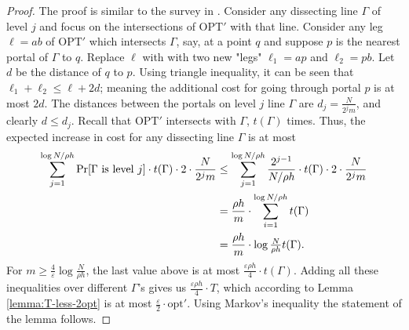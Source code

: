 \documentclass[10pt,a4paper]{amsart}
\theoremstyle{thmstyleone}
\newcommand{\eps}{\varepsilon}
\newcommand{\opt}{{\text{opt}}}
\newcommand{\OPT}{{\text{OPT}}}
\begin{document}
\begin{proof}
	The proof is similar to the survey in \cite{Vazirani}.
    Consider any dissecting line $\Gamma$ of level $j$ and focus on the intersections of $\OPT'$ with that line. Consider any leg $\ell = ab$ of $\OPT'$ which intersects $\Gamma$, say, at a point $q$ and suppose $p$ is the nearest portal of $\Gamma$ to $q$. Replace $\ell$ with
    with two new "legs" $\ell_1 = ap$ and $\ell_2 = pb$. Let $d$ be the distance of $q$ to $p$. Using triangle inequality, it can be seen that $\ell_1 + \ell_2 \leq \ell + 2d$; meaning the additional cost for going through portal $p$ is at most $2d$. The distances between the portals on level $j$ line $\Gamma$ are $d_j = \frac N{2^jm}$, and clearly $d\le d_j$. Recall that $\OPT'$ intersects with $\Gamma$, $t(\Gamma)$ times. Thus, the expected increase in cost for any dissecting line $\Gamma$ is at most
    \begin{align*}
        \sum_{j = 1}^{\log N/\rho h}\Pr[\Gamma {\rm \ is\ level\ } j]\cdot t(\Gamma)\cdot 2\cdot\frac N{2^jm} &\le \sum_{j = 1}^{\log N/\rho h}\frac{2^{j - 1}}{N/\rho h}\cdot t(\Gamma)\cdot2\cdot \frac N{2^j m}\\
        &= \frac{\rho h}m\cdot \sum_{i = 1}^{\log N/\rho h} t(\Gamma)\\
        &= \frac{\rho h}m \cdot \log \tfrac N{\rho h} t(\Gamma).
    \end{align*}
    For
    $m \ge \frac{4}\eps \log\frac N{\rho h}$, the last value above is at most $ \frac{\eps\rho h}{4}\cdot t(\Gamma)$. Adding all these inequalities over different $\Gamma$'s gives us $\frac{\eps\rho h}{4}\cdot T$, which according to Lemma \ref{lemma:T-less-2opt} is at most $\frac\eps2\cdot \opt'$. Using Markov's inequality the statement of the lemma follows.
\end{proof}
\end{document}
